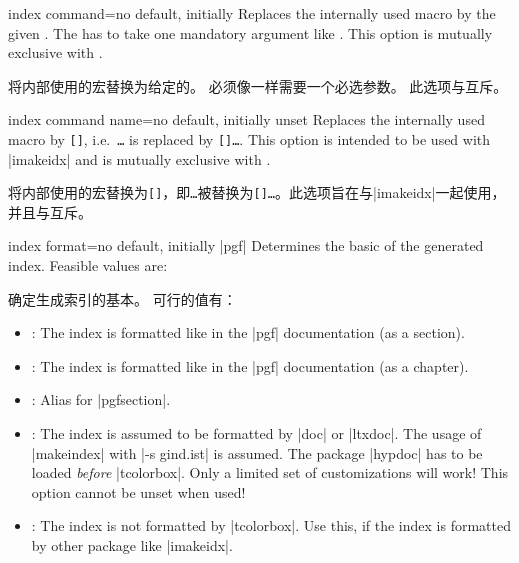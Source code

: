 \begin{docTcbKey}[][doc new=2015-01-09]{index command}{=}{no default, initially }
Replaces the internally used  macro by the given .
The  has to take one mandatory argument like .
This option is mutually exclusive with .

将内部使用的宏替换为给定的。 必须像一样需要一个必选参数。 此选项与互斥。
\begin{dispListing}
\end{dispListing}
\end{docTcbKey}


\begin{docTcbKey}[][doc new=2015-01-09]{index command name}{=}{no default, initially unset}
Replaces the internally used  macro by
\mbox{\texttt{[]}}, i.e.\ 
\mbox{\texttt{\textbraceleft\ldots\textbraceright}} is replaced by
\mbox{\cs{index}\texttt{[\meta{name}]\textbraceleft\ldots\textbraceright}}.
This option is intended to be used with |imakeidx| and is
mutually exclusive with .

将内部使用的宏替换为\mbox{\texttt{[]}}，即\mbox{\texttt{\textbraceleft\ldots\textbraceright}}被替换为\mbox{\texttt{[]\textbraceleft\ldots\textbraceright}}。此选项旨在与|imakeidx|一起使用，并且与互斥。
\begin{dispListing}
\end{dispListing}
\end{docTcbKey}



\begin{docTcbKey}{index format}{=}{no default, initially |pgf|}
Determines the basic \meta{format} of the generated index.
Feasible values are:

确定生成索引的基本。 可行的值有：
\begin{itemize}
\item{}: The index is formatted like in the |pgf| documentation (as a section).
\item\docValue{pgfchapter}: The index is formatted like in the |pgf| documentation (as a chapter).
\item\docValue{pgf}: Alias for |pgfsection|.
\item{}: The index is assumed to be formatted by |doc| or |ltxdoc|. The usage of |makeindex|
with |-s gind.ist| is assumed. The package |hypdoc| has to be loaded
\emph{before} |tcolorbox|. Only a limited set of customizations will
work! This option cannot be unset when used!
\item{}: The index is not formatted by |tcolorbox|. Use this, if
the index is formatted by other package like |imakeidx|.
\end{itemize}
\end{docTcbKey}

